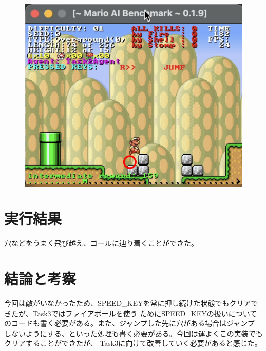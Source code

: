 \documentclass[a4paper,11pt]{jsarticle}
\begin{document}
\begin{figure}[h]
  \centering
  \includegraphics*[scale=0.6]{
    images/report2/walking-jump.png
  }
  \caption[図2]{}
\end{figure}

\section*{実行結果}
穴などをうまく飛び越え、ゴールに辿り着くことができた。

\section*{結論と考察}
今回は敵がいなかったため、SPEED\_KEYを常に押し続けた状態でもクリアできたが、Task3ではファイアボールを使う
ためにSPEED\_KEYの扱いについてのコードも書く必要がある。また、ジャンプした先に穴がある場合はジャンプ
しないようにする、といった処理も書く必要がある。今回は運よくこの実装でもクリアすることができたが、
Task3に向けて改善していく必要があると感じた。

\printbibliography[title=参考文献]
\end{document}
